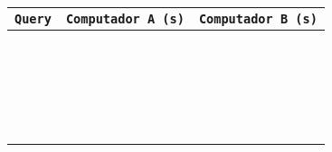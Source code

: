 \documentclass[12pt,a4paper]{report}
\begin{document}
{
\setlength\arrayrulewidth{1pt}
\begin{tabularx}{\textwidth} { 
  | >{\centering\arraybackslash}X
  | >{\centering\arraybackslash}X
  | >{\centering\arraybackslash}X | }
 \hline
 \texttt{\textbf{Query}} & \texttt{\textbf{Computador A (s)}} & \texttt{\textbf{Computador B (s)}} \\
 \hline
 \texttt{\textbf{}} & \texttt{\textbf{}} & \texttt{\textbf{}} \\
 \hline
 \texttt{\textbf{}} & \texttt{\textbf{}} & \texttt{\textbf{}} \\
 \hline
 \texttt{\textbf{}} & \texttt{\textbf{}} & \texttt{\textbf{}} \\
 \hline
 \texttt{\textbf{}} & \texttt{\textbf{}} & \texttt{\textbf{}} \\
 \hline
 \texttt{\textbf{}} & \texttt{\textbf{}} & \texttt{\textbf{}} \\
 \hline
 \texttt{\textbf{}} & \texttt{\textbf{}} & \texttt{\textbf{}} \\
 \hline
 \texttt{\textbf{}} & \texttt{\textbf{}} & \texttt{\textbf{}} \\
 \hline
 \texttt{\textbf{}} & \texttt{\textbf{}} & \texttt{\textbf{}} \\
 \hline
 \texttt{\textbf{}} & \texttt{\textbf{}} & \texttt{\textbf{}} \\
 \hline
 \texttt{\textbf{}} & \texttt{\textbf{}} & \texttt{\textbf{}} \\
 \hline
 \texttt{\textbf{}} & \texttt{\textbf{}} & \texttt{\textbf{}} \\
 \hline
 \texttt{\textbf{}} & \texttt{\textbf{}} & \texttt{\textbf{}} \\
 \hline
 \texttt{\textbf{}} & \texttt{\textbf{}} & \texttt{\textbf{}} \\
 \hline
 \texttt{\textbf{}} & \texttt{\textbf{}} & \texttt{\textbf{}} \\
 \hline
 \texttt{\textbf{}} & \texttt{\textbf{}} & \texttt{\textbf{}} \\
 \hline
 \texttt{\textbf{}} & \texttt{\textbf{}} & \texttt{\textbf{}} \\
 \hline
 \texttt{\textbf{}} & \texttt{\textbf{}} & \texttt{\textbf{}} \\
 \hline
 \texttt{\textbf{}} & \texttt{\textbf{}} & \texttt{\textbf{}} \\
 \hline
 \texttt{\textbf{}} & \texttt{\textbf{}} & \texttt{\textbf{}} \\
 \hline
 \texttt{\textbf{}} & \texttt{\textbf{}} & \texttt{\textbf{}} \\
 \hline
 \texttt{\textbf{}} & \texttt{\textbf{}} & \texttt{\textbf{}} \\
 \hline
 \end{tabularx}
}
\end{document}
